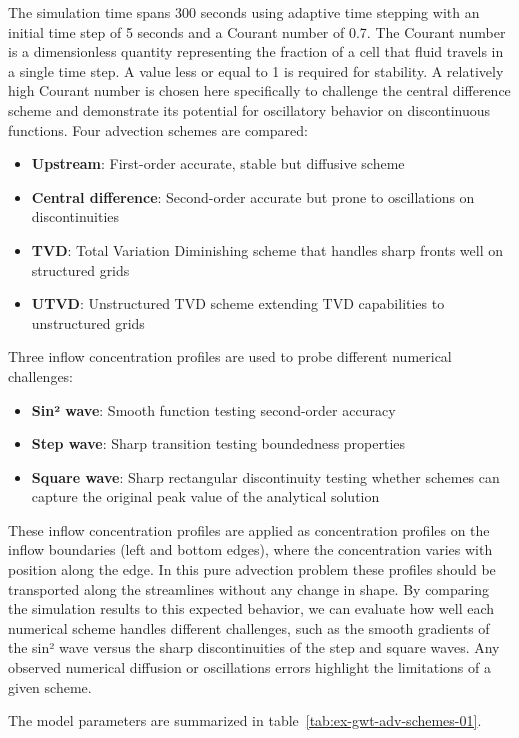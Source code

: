 \noindent The simulation time spans 300 seconds using adaptive time stepping with an initial time step of 5 seconds and a Courant number of 0.7. The Courant number is a dimensionless quantity representing the fraction of a cell that fluid travels in a single time step. A value less or equal to 1 is required for stability. A relatively high Courant number is chosen here specifically to challenge the central difference scheme and demonstrate its potential for oscillatory behavior on discontinuous functions. Four advection schemes are compared:
\begin{itemize}
\item \textbf{Upstream}: First-order accurate, stable but diffusive scheme
\item \textbf{Central difference}: Second-order accurate but prone to oscillations on discontinuities
\item \textbf{TVD}: Total Variation Diminishing scheme that handles sharp fronts well on structured grids
\item \textbf{UTVD}: Unstructured TVD scheme extending TVD capabilities to unstructured grids
\end{itemize}

\noindent Three inflow concentration profiles are used to probe different numerical challenges:
\begin{itemize}
\item \textbf{Sin² wave}: Smooth function testing second-order accuracy
\item \textbf{Step wave}: Sharp transition testing boundedness properties
\item \textbf{Square wave}: Sharp rectangular discontinuity testing whether schemes can capture the original peak value of the analytical solution
\end{itemize}

These inflow concentration profiles are applied as concentration profiles on the inflow boundaries (left and bottom edges), where the concentration varies with position along the edge. In this pure advection problem these profiles should be transported along the streamlines without any change in shape. By comparing the simulation results to this expected behavior, we can evaluate how well each numerical scheme handles different challenges, such as the smooth gradients of the sin² wave versus the sharp discontinuities of the step and square waves. Any observed numerical diffusion or oscillations errors highlight the limitations of a given scheme.

The model parameters are summarized in table~\ref{tab:ex-gwt-adv-schemes-01}.

